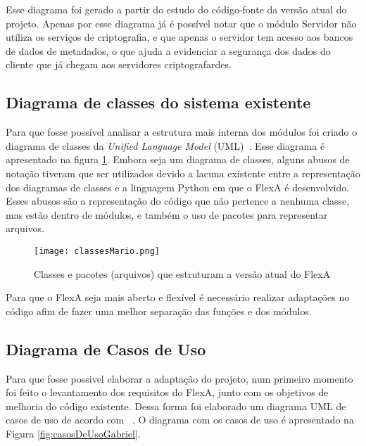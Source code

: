         Esse diagrama foi gerado a partir do estudo do código-fonte da versão atual do projeto. Apenas por esse diagrama já é possível notar que o módulo Servidor não utiliza os serviços de criptografia, e que apenas o servidor tem acesso aos bancos de dados de metadados, o que ajuda a evidenciar a segurança dos dados do cliente que já chegam aos servidores criptografardes.
    
    \subsection{Diagrama de classes do sistema existente} 
    
        Para que fosse possível analisar a estrutura mais interna dos módulos foi criado o diagrama de classes da \textit{Unified Language Model} (UML)~\cite{umlClasses}. Esse diagrama é apresentado na figura \ref{fig:classesMario}. Embora seja um diagrama de classes, alguns abusos de notação tiveram que ser utilizados devido a lacuna existente entre a representação dos diagramas de classes e a linguagem Python em que o FlexA é desenvolvido. Esses abusos são a representação do código que não pertence a nenhuma classe, mas estão dentro de módulos, e também o uso de pacotes para representar arquivos.
        
        \begin{figure}[!ht]
        \centering
        \texttt{[image: classesMario.png]}
        \caption{Classes e pacotes (arquivos) que estruturam a versão atual do FlexA}
        \label{fig:classesMario}
        \end{figure}
             
        
        Para que o FlexA seja mais aberto e flexível é necessário realizar adaptações no código afim de fazer uma melhor separação das funções e dos módulos.
        
        \subsection{Diagrama de Casos de Uso}
        
        Para que fosse possivel elaborar a adaptação do projeto, num primeiro momento foi feito o levantamento dos requisitos do FlexA, junto com os objetivos de melhoria do código existente. Dessa forma foi elaborado um diagrama UML de casos de uso de acordo com ~\cite{umlCasosDeUso}. O diagrama com os casos de uso é apresentado na Figura \ref{fig:casosDeUsoGabriel}.
        
